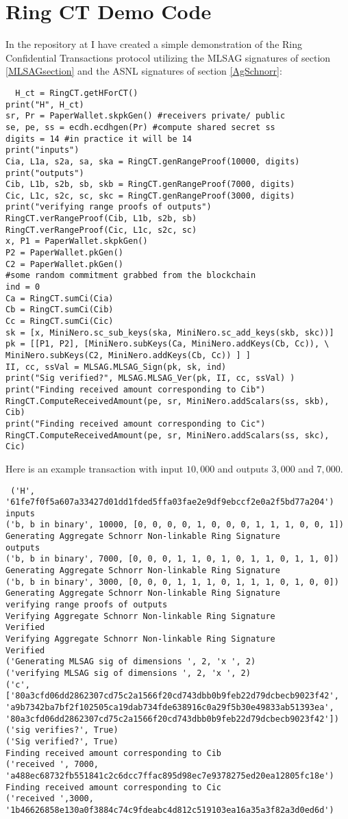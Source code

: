 \documentclass[12pt,english]{mrl}
\theoremstyle{definition}
\numberwithin{equation}{section}
\numberwithin{figure}{section}
\numberwithin{equation}{section}
\numberwithin{equation}{section}
\numberwithin{figure}{section}
\begin{document}
\section{Ring CT Demo Code}
In the repository at \cite{Snoe} I have created a simple demonstration of the Ring Confidential Transactions protocol utilizing the MLSAG signatures of section \ref{MLSAGsection} and the ASNL signatures of section \ref{AgSchnorr}:
\begin{verbatim}
  H_ct = RingCT.getHForCT()
print("H", H_ct)
sr, Pr = PaperWallet.skpkGen() #receivers private/ public
se, pe, ss = ecdh.ecdhgen(Pr) #compute shared secret ss
digits = 14 #in practice it will be 14
print("inputs")
Cia, L1a, s2a, sa, ska = RingCT.genRangeProof(10000, digits)
print("outputs")
Cib, L1b, s2b, sb, skb = RingCT.genRangeProof(7000, digits)
Cic, L1c, s2c, sc, skc = RingCT.genRangeProof(3000, digits)
print("verifying range proofs of outputs")
RingCT.verRangeProof(Cib, L1b, s2b, sb)
RingCT.verRangeProof(Cic, L1c, s2c, sc)
x, P1 = PaperWallet.skpkGen()
P2 = PaperWallet.pkGen()
C2 = PaperWallet.pkGen() 
#some random commitment grabbed from the blockchain
ind = 0
Ca = RingCT.sumCi(Cia)
Cb = RingCT.sumCi(Cib)
Cc = RingCT.sumCi(Cic)
sk = [x, MiniNero.sc_sub_keys(ska, MiniNero.sc_add_keys(skb, skc))]
pk = [[P1, P2], [MiniNero.subKeys(Ca, MiniNero.addKeys(Cb, Cc)), \
MiniNero.subKeys(C2, MiniNero.addKeys(Cb, Cc)) ] ]
II, cc, ssVal = MLSAG.MLSAG_Sign(pk, sk, ind)
print("Sig verified?", MLSAG.MLSAG_Ver(pk, II, cc, ssVal) )
print("Finding received amount corresponding to Cib")
RingCT.ComputeReceivedAmount(pe, sr, MiniNero.addScalars(ss, skb), Cib)
print("Finding received amount corresponding to Cic")
RingCT.ComputeReceivedAmount(pe, sr, MiniNero.addScalars(ss, skc), Cic)

\end{verbatim} 
Here is an example transaction with input $10,000$ and outputs $3,000$ and $7,000$. 
\begin{verbatim}
 ('H', '61fe7f0f5a607a33427d01dd1fded5ffa03fae2e9df9ebccf2e0a2f5bd77a204')
inputs
('b, b in binary', 10000, [0, 0, 0, 0, 1, 0, 0, 0, 1, 1, 1, 0, 0, 1])
Generating Aggregate Schnorr Non-linkable Ring Signature
outputs
('b, b in binary', 7000, [0, 0, 0, 1, 1, 0, 1, 0, 1, 1, 0, 1, 1, 0])
Generating Aggregate Schnorr Non-linkable Ring Signature
('b, b in binary', 3000, [0, 0, 0, 1, 1, 1, 0, 1, 1, 1, 0, 1, 0, 0])
Generating Aggregate Schnorr Non-linkable Ring Signature
verifying range proofs of outputs
Verifying Aggregate Schnorr Non-linkable Ring Signature
Verified
Verifying Aggregate Schnorr Non-linkable Ring Signature
Verified
('Generating MLSAG sig of dimensions ', 2, 'x ', 2)
('verifying MLSAG sig of dimensions ', 2, 'x ', 2)
('c', 
['80a3cfd06dd2862307cd75c2a1566f20cd743dbb0b9feb22d79dcbecb9023f42',
'a9b7342ba7bf2f102505ca19dab734fde638916c0a29f5b30e49833ab51393ea',
'80a3cfd06dd2862307cd75c2a1566f20cd743dbb0b9feb22d79dcbecb9023f42'])
('sig verifies?', True)
('Sig verified?', True)
Finding received amount corresponding to Cib
('received ', 7000,
'a488ec68732fb551841c2c6dcc7ffac895d98ec7e9378275ed20ea12805fc18e')
Finding received amount corresponding to Cic
('received ',3000,
'1b46626858e130a0f3884c74c9fdeabc4d812c519103ea16a35a3f82a3d0ed6d')
\end{verbatim}
\end{document}
